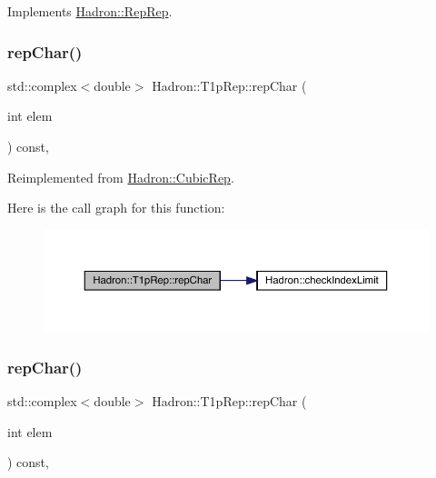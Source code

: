 Implements \mbox{\hyperlink{structHadron_1_1RepRep_ab3213025f6de249f7095892109575fde}{Hadron\+::\+Rep\+Rep}}.

\mbox{\label{structHadron_1_1T1pRep_ad5fd4bf6eaa8fd1a465bd6757d7b4379}} 
\subsubsection{\texorpdfstring{repChar()}{repChar()}\hspace{0.1cm}{\footnotesize\ttfamily [1/3]}}
{\footnotesize\ttfamily std\+::complex$<$double$>$ Hadron\+::\+T1p\+Rep\+::rep\+Char (\begin{DoxyParamCaption}\item[{int}]{elem }\end{DoxyParamCaption}) const\hspace{0.3cm}{\ttfamily [inline]}, {\ttfamily [virtual]}}



Reimplemented from \mbox{\hyperlink{structHadron_1_1CubicRep_af45227106e8e715e84b0af69cd3b36f8}{Hadron\+::\+Cubic\+Rep}}.

Here is the call graph for this function\+:
\nopagebreak
\begin{figure}[H]
\begin{center}
\leavevmode
\includegraphics[width=350pt]{df/dba/structHadron_1_1T1pRep_ad5fd4bf6eaa8fd1a465bd6757d7b4379_cgraph}
\end{center}
\end{figure}
\mbox{\label{structHadron_1_1T1pRep_ad5fd4bf6eaa8fd1a465bd6757d7b4379}} 
\subsubsection{\texorpdfstring{repChar()}{repChar()}\hspace{0.1cm}{\footnotesize\ttfamily [2/3]}}
{\footnotesize\ttfamily std\+::complex$<$double$>$ Hadron\+::\+T1p\+Rep\+::rep\+Char (\begin{DoxyParamCaption}\item[{int}]{elem }\end{DoxyParamCaption}) const\hspace{0.3cm}{\ttfamily [inline]}, {\ttfamily [virtual]}}



